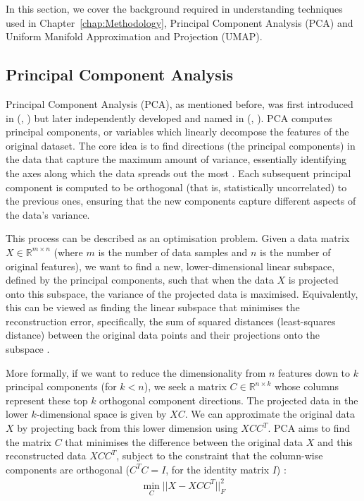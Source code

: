 \documentclass[10pt,oneside]{report}
\renewcommand{\citet}[1]{\citeauthor{#1}, \citeyear{#1}}
\begin{document}
In this section, we cover the background required in understanding techniques used in Chapter~\ref{chap:Methodology}, Principal Component Analysis (PCA) and Uniform Manifold Approximation and Projection (UMAP).


\subsection{Principal Component Analysis}
Principal Component Analysis (PCA), as mentioned before, was first introduced in (\citet{pearson1901liii}) but later independently developed and named in (\citet{hotelling1933analysis}). PCA computes principal components, or variables which linearly decompose the features of the original dataset.
The core idea is to find directions (the principal components) in the data that capture the maximum amount of variance, essentially identifying the axes along which the data spreads out the most \cite{abdi2010principal}. Each subsequent principal component is computed to be orthogonal (that is, statistically uncorrelated) to the previous ones, ensuring that the new components capture different aspects of the data's variance.

This process can be described as an optimisation problem. Given a data matrix $X \in \mathbb{R}^{m \times n}$ (where $m$ is the number of data samples and $n$ is the number of original features), we want to find a new, lower-dimensional linear subspace, defined by the principal components, such that when the data $X$ is projected onto this subspace, the variance of the projected data is maximised. Equivalently, this can be viewed as finding the linear subspace that minimises the reconstruction error, specifically, the sum of squared distances (least-squares distance) between the original data points and their projections onto the subspace \cite{udell2016generalized}.

More formally, if we want to reduce the dimensionality from $n$ features down to $k$ principal components (for $k < n$), we seek a matrix $C \in \mathbb{R}^{n \times k}$ whose columns represent these top $k$ orthogonal component directions. The projected data in the lower $k$-dimensional space is given by $XC$. We can approximate the original data $X$ by projecting back from this lower dimension using $XCC^T$. PCA aims to find the matrix $C$ that minimises the difference between the original data $X$ and this reconstructed data $XCC^T$, subject to the constraint that the column-wise components are orthogonal ($C^TC = I$, for the identity matrix $I$) \cite{udell2016generalized}:
\begin{align}
    \min_C || X - XCC^T ||_F^2 
    \label{eq:pca} %
\end{align}
\end{document}
